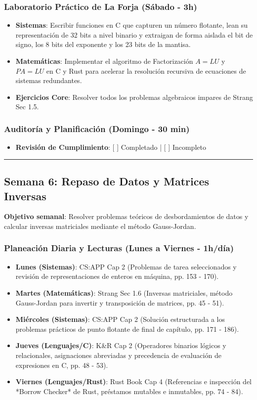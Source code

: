 \documentclass[11pt, a4paper]{article}
\begin{document}
\subsubsection{Laboratorio Práctico de La Forja (Sábado - 3h)}
\begin{itemize}
    \item \textbf{Sistemas}: Escribir funciones en C que capturen un número flotante, lean su representación de 32 bits a nivel binario y extraigan de forma aislada el bit de signo, los 8 bits del exponente y los 23 bits de la mantisa.
    \item \textbf{Matemáticas}: Implementar el algoritmo de Factorización $A = LU$ y $PA = LU$ en C y Rust para acelerar la resolución recursiva de ecuaciones de sistemas redundantes.
    \item \textbf{Ejercicios Core}: Resolver todos los problemas algebraicos impares de Strang Sec 1.5.
\end{itemize}

\subsubsection{Auditoría y Planificación (Domingo - 30 min)}
\begin{itemize}
    \item \textbf{Revisión de Cumplimiento}: [ ] Completado | [ ] Incompleto
\end{itemize}

\noindent\rule{\textwidth}{0.4pt}

\subsection{Semana 6: Repaso de Datos y Matrices Inversas}
\textbf{Objetivo semanal}: Resolver problemas teóricos de desbordamientos de datos y calcular inversas matriciales mediante el método Gauss-Jordan.

\subsubsection{Planeación Diaria y Lecturas (Lunes a Viernes - 1h/día)}
\begin{itemize}
    \item \textbf{Lunes (Sistemas)}: CS:APP Cap 2 (Problemas de tarea seleccionados y revisión de representaciones de enteros en máquina, pp. 153 - 170).
    \item \textbf{Martes (Matemáticas)}: Strang Sec 1.6 (Inversas matriciales, método Gauss-Jordan para invertir y transposición de matrices, pp. 45 - 51).
    \item \textbf{Miércoles (Sistemas)}: CS:APP Cap 2 (Solución estructurada a los problemas prácticos de punto flotante de final de capítulo, pp. 171 - 186).
    \item \textbf{Jueves (Lenguajes/C)}: K\&R Cap 2 (Operadores binarios lógicos y relacionales, asignaciones abreviadas y precedencia de evaluación de expresiones en C, pp. 48 - 53).
    \item \textbf{Viernes (Lenguajes/Rust)}: Rust Book Cap 4 (Referencias e inspección del *Borrow Checker* de Rust, préstamos mutables e inmutables, pp. 74 - 84).
\end{itemize}
\end{document}
